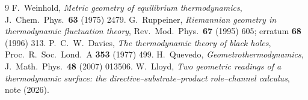 \documentclass[11pt]{article}
\begin{document}
\begin{thebibliography}{9}
 F.~Weinhold, \emph{Metric geometry of equilibrium thermodynamics},
J.~Chem.~Phys.\ \textbf{63} (1975) 2479.
 G.~Ruppeiner, \emph{Riemannian geometry in thermodynamic fluctuation
theory}, Rev.~Mod.~Phys.\ \textbf{67} (1995) 605; erratum \textbf{68} (1996) 313.
 P.~C.~W.~Davies, \emph{The thermodynamic theory of black holes},
Proc.~R.~Soc.~Lond.~A \textbf{353} (1977) 499.
 H.~Quevedo, \emph{Geometrothermodynamics}, J.~Math.~Phys.\ \textbf{48}
(2007) 013506.
 W.~Lloyd, \emph{Two geometric readings of a thermodynamic surface: the
directive--substrate--product role--channel calculus}, note (2026).
\end{thebibliography}
\end{document}
